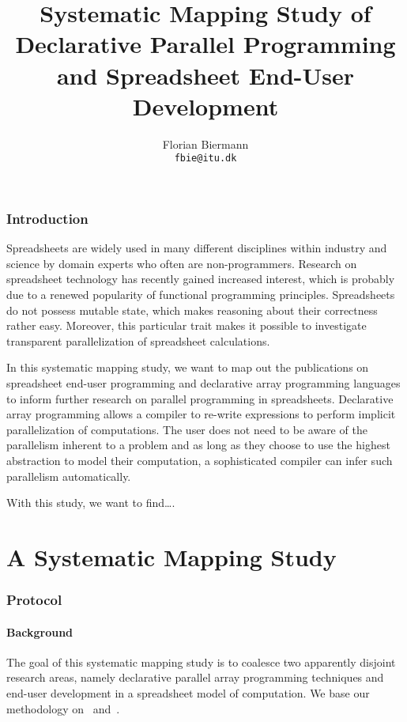 \documentclass[a4paper]{article}
\title{Systematic Mapping Study of Declarative Parallel Programming
  and Spreadsheet End-User Development}
\author{Florian Biermann\\\small{\texttt{fbie@itu.dk}}}
\begin{document}
\maketitle

\section{Introduction}
\label{sec:intro}

Spreadsheets are widely used in many different disciplines within
industry and science by domain experts who often are
non-programmers. Research on spreadsheet
technology has recently gained increased interest, which is probably
due to a renewed popularity of functional programming
principles. Spreadsheets do not possess mutable state, which makes
reasoning about their correctness rather easy. Moreover, this
particular trait makes it possible to investigate transparent
parallelization of spreadsheet calculations.

In this systematic mapping study, we want to map out the publications
on spreadsheet end-user programming and declarative array programming
languages to inform further research on parallel programming in
spreadsheets. Declarative array programming allows a compiler to
re-write expressions to perform implicit parallelization of
computations. The user does not need to be aware of the parallelism
inherent to a problem and as long as they choose to use the highest
abstraction to model their computation, a sophisticated compiler can
infer such parallelism automatically.

With this study, we want to find\dots.

\newpage{}
\part{A Systematic Mapping Study}
\label{part:syst-mapp-study}

\section{Protocol}
\label{sec:protocol}

\subsection{Background}
\label{sec:background}

The goal of this systematic mapping study is to coalesce two
apparently disjoint research areas, namely declarative parallel array
programming techniques and end-user development in a spreadsheet model
of computation. We base our methodology on~\citet{keele2007guidelines}
and~\citet{petersen2008systematic}.
\end{document}
